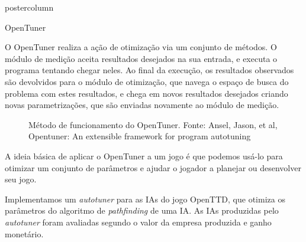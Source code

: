 \documentclass[final]{beamer}
\begin{document}
\begin{frame}
\begin{columns}
\begin{column}{.5\textwidth}
\begin{beamercolorbox}[center,wd=\textwidth]{postercolumn}
\begin{minipage}[T]{.95\textwidth}
{\begin{block}{OpenTuner}
                \vspace*{0.2cm}
                
                O OpenTuner realiza a ação de otimização via um conjunto de métodos. O módulo de medição aceita resultados desejados na sua entrada, e executa o programa tentando chegar neles. Ao final da execução, os resultados observados são devolvidos para o módulo de otimização, que navega o espaço de busca do problema com estes resultados, e chega em novos resultados desejados criando novas parametrizações, que são enviadas novamente ao módulo de medição.
                
                \vspace*{0.4cm} 
                
                
                \begin{figure}[h]
                  \caption{Método de funcionamento do OpenTuner.
                    Fonte: Ansel, Jason, et al, Opentuner: An extensible framework for program autotuning}
                \end{figure}
                
                \vspace*{0.2cm} 
                
                 A ideia básica  de aplicar o OpenTuner a um jogo é que podemos usá-lo para otimizar um conjunto de parâmetros e ajudar o jogador a planejar ou desenvolver seu jogo.
                 
                 \vspace*{0.2cm} 
                 
                 Implementamos um \textit{autotuner} para as IAs do jogo OpenTTD, que otimiza os parâmetros do algoritmo de \textit{pathfinding} de uma IA. As IAs produzidas pelo \textit{autotuner} foram avaliadas segundo o valor da empresa produzida e ganho monetário.
                               

\end{block}}
\end{minipage}
\end{beamercolorbox}
\end{column}
\end{columns}
\end{frame}
\end{document}

